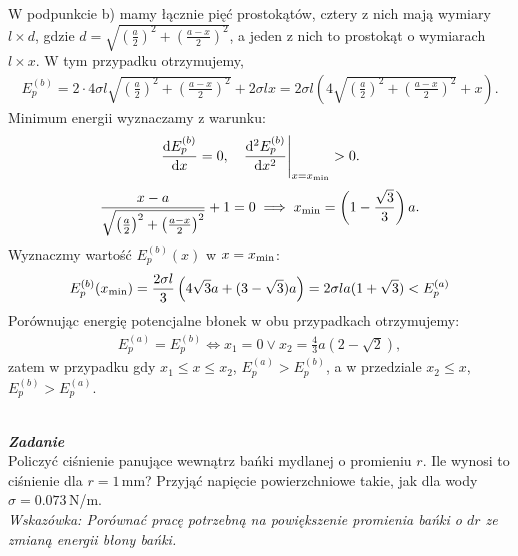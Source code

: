 \documentclass[11pt,a4paper]{article}
\newcounter{zadanie}\newcommand{\zadanie}[1][]{\addtocounter{zadanie}{1} ~\\  {\bf \emph{Zadanie \arabic{zadanie} #1 }} \\}
\begin{document}
W podpunkcie b) mamy łącznie pięć prostokątów, cztery z nich mają wymiary $ l \times d$, gdzie $ d= \sqrt{\left(\frac{a}{2} \right)^2 + \left(\frac{a-x}{2} \right)^2  }$, a jeden z nich to prostokąt o wymiarach $l \times x$. W tym przypadku otrzymujemy, 
\begin{align}
E_p^{(b)} =  2 \cdot 4 \sigma l  \sqrt{\left(\frac{a}{2} \right)^2 + \left(\frac{a-x}{2} \right)^2}  + 2 \sigma l x= 2 \sigma l \left( 4 \sqrt{\left(\frac{a}{2} \right)^2 + \left(\frac{a-x}{2} \right)^2}  + x \right).
\end{align}
Minimum energii wyznaczamy z warunku:
\begin{align}
\left. \frac{{\rm d} E_p^{(b)}}{{\rm d} x} = 0 , \quad \frac{{\rm d^2} E_p^{(b)}}{{\rm d} x^2} \right\lvert_{x=x_{\rm min}}  > 0. 
\end{align}
\begin{align}
\frac{x-a}{\sqrt{\left(\frac{a}{2} \right)^2 + \left(\frac{a-x}{2} \right)^2} } + 1=0 \implies x_{\rm min} = \left( 1 - \frac{\sqrt{3}}{3}\right)a. 
\end{align}
Wyznaczmy wartość $E_p^{(b)}(x)$ w $x=x_{\rm min}  $:
\begin{align}
E_p^{(b)}(x_{\rm min}) = \frac{2\sigma l }{3}\left(  4 \sqrt{3} a + (3 -\sqrt{3})a\right) =2 \sigma l a (1 + \sqrt{3}  ) < E_p^{(a)}
\end{align}
Porównując energię potencjalne błonek w obu przypadkach otrzymujemy:
\begin{align}
E_p^{(a)} = E_p^{(b)} \Leftrightarrow x_1=0 \lor x_2 = \frac{4}{3}a \left(2 - \sqrt{2} \right), 
\end{align}
zatem w przypadku gdy $x_1\leq x \leq x_2$,  $E_p^{(a)}> E_p^{(b)}$, a w przedziale $x_2 \leq  x$,  $E_p^{(b)}> E_p^{(a)}$.

\newpage

\zadanie
Policzyć ciśnienie panujące wewnątrz bańki mydlanej o promieniu $r$.
Ile wynosi to ciśnienie dla $r = 1$\,mm? Przyjąć napięcie powierzchniowe takie,
jak dla wody $\sigma = 0.073$\,N/m.\\[1mm]
{\em Wskazówka: Porównać pracę potrzebną na powiększenie promienia bańki o $dr$
ze zmianą energii błony bańki.}
\end{document}
